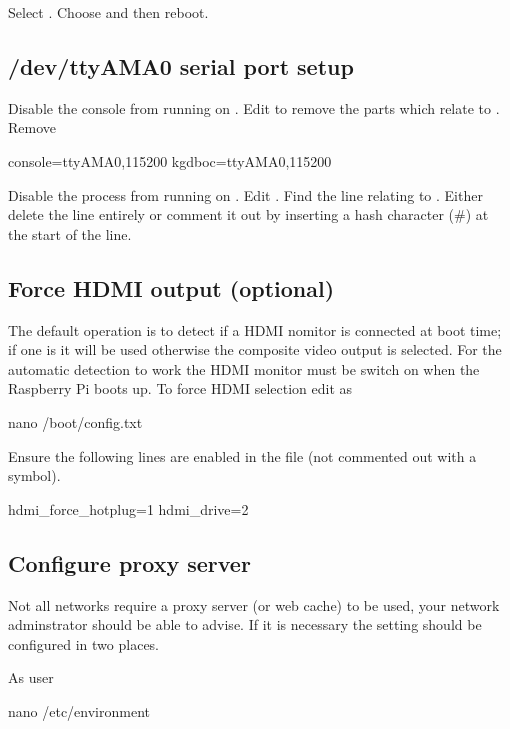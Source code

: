 Select . Choose  and then reboot.



\subsection{/dev/ttyAMA0 serial port setup}

Disable the console from running on . Edit
 to remove the parts which relate to
. Remove
\begin{Cmd}
console=ttyAMA0,115200 kgdboc=ttyAMA0,115200
\end{Cmd}


Disable the  process from running on
. Edit . Find the line
relating to . Either delete the line entirely or
comment it out by inserting a hash character (\#) at the start of the
line.

\subsection{Force HDMI output (optional)}
The default operation is to detect if a HDMI nomitor is connected at
boot time; if one is it will be used otherwise the composite video
output is selected. For the automatic detection to work the HDMI
monitor must be switch on when the Raspberry Pi boots up. To force
HDMI selection edit  as \rootUser
\begin{Cmd}
nano /boot/config.txt
\end{Cmd}

Ensure the following lines are enabled in the file (not commented out
with a \code{\#} symbol).
\begin{Cmd}
hdmi_force_hotplug=1
hdmi_drive=2  
\end{Cmd}

\subsection{Configure proxy server}
Not all networks require a proxy server (or web cache) to be used,
your network adminstrator should be able to advise. If it is necessary
the setting should be configured in two places.

As user \rootUser
\begin{Cmd}
nano /etc/environment  
\end{Cmd}

